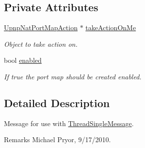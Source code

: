 \subsection*{Private Attributes}
\begin{DoxyCompactItemize}
\item 
\hypertarget{class_thread_message_item_set_port_map_enabled_a723477d8abcd39952b292a9e0868bc71}{
\hyperlink{class_upnp_nat_port_map_action}{UpnpNatPortMapAction} $\ast$ \hyperlink{class_thread_message_item_set_port_map_enabled_a723477d8abcd39952b292a9e0868bc71}{takeActionOnMe}}
\label{class_thread_message_item_set_port_map_enabled_a723477d8abcd39952b292a9e0868bc71}

\begin{DoxyCompactList}\small\item\em Object to take action on. \item\end{DoxyCompactList}\item 
\hypertarget{class_thread_message_item_set_port_map_enabled_a5bbfca16d9ea393c002ac4c9720da28a}{
bool \hyperlink{class_thread_message_item_set_port_map_enabled_a5bbfca16d9ea393c002ac4c9720da28a}{enabled}}
\label{class_thread_message_item_set_port_map_enabled_a5bbfca16d9ea393c002ac4c9720da28a}

\begin{DoxyCompactList}\small\item\em If true the port map should be created enabled. \item\end{DoxyCompactList}\end{DoxyCompactItemize}


\subsection{Detailed Description}
Message for use with \hyperlink{class_thread_single_message}{ThreadSingleMessage}. \begin{DoxyRemark}{Remarks}
Michael Pryor, 9/17/2010. 
\end{DoxyRemark}


